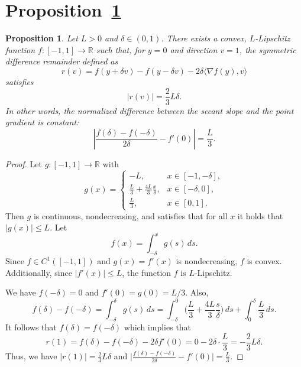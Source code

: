 \documentclass[journal,onecolumn]{IEEEtran}
\theoremstyle{plain}
\newtheorem{proposition}[theorem]{Proposition}
\theoremstyle{definition}
\theoremstyle{remark}
\begin{document}
    
    {\appendices
\section{Proposition~\ref{prop:linear-remainder-no-smooth}}\label{app:smooth}
\begin{proposition}
\label{prop:linear-remainder-no-smooth}
Let $L>0$ and $\delta\in(0,1)$. There exists a convex,
$L$-Lipschitz function $f:[-1,1]\to\mathbb{R}$ such that, for $y=0$ and direction $v=1$,
the symmetric difference remainder   defined as
\begin{equation*}
r(v)= f(y+\delta v)-f(y-\delta v)-2\delta \langle \nabla f(y),v\rangle
\end{equation*}
satisfies
\begin{equation*}
|r(v)|=\frac{2}{3}L\delta.
\end{equation*}
In other words, the normalized difference between the secant slope and the point gradient is constant:
\begin{equation*}
\left|\frac{f(\delta)-f(-\delta)}{2\delta}-f'(0)\right|=\frac{L}{3}.
\end{equation*}
\end{proposition}

\begin{proof}
Let $g:[-1,1]\to\mathbb{R}$ with
\begin{equation*}
g(x)=
\begin{cases}
-L, & x\in[-1,-\delta],\\[1mm]
\frac{L}{3}+\frac{4L}{3}\frac{x}{\delta}, & x\in[-\delta,0],\\[2mm]
\frac{L}{3}, & x\in[0,1].
\end{cases}
\end{equation*}
Then $g$ is continuous, nondecreasing, and satisfies that for all $x$ it holds that $|g(x)|\le L$.
Let
\begin{equation*}
f(x)=\int_{-\delta}^{x} g(s)\,ds.
\end{equation*}
Since $f\in C^1([-1,1])$ and $g(x)=f'(x)$ is nondecreasing, $f$ is convex. Additionally, since $|f'(x)|\le L$, the function $f$ is $L$-Lipschitz.

We have $f(-\delta)=0$ and $f'(0)=g(0)=L/3$. Also,
\begin{equation*}
f(\delta)-f(-\delta)=\int_{-\delta}^{\delta} g(s)\,ds
=\int_{-\delta}^{0}\Big(\frac{L}{3}+\frac{4L}{3}\frac{s}{\delta}\Big)\,ds
+\int_{0}^{\delta}\frac{L}{3}\,ds.
\end{equation*}
It follows that $f(\delta)=f(-\delta)$ which implies that
\begin{equation*}
r(1)=f(\delta)-f(-\delta)-2\delta f'(0)=0-2\delta\cdot \frac{L}{3}=-\frac{2}{3}L\delta.
\end{equation*}
Thus, we have $|r(1)|=\frac{2}{3}L\delta$ and $\Big|\frac{f(\delta)-f(-\delta)}{2\delta}-f'(0)\Big|=\frac{L}{3}$.
\end{proof}


}
\end{document}
